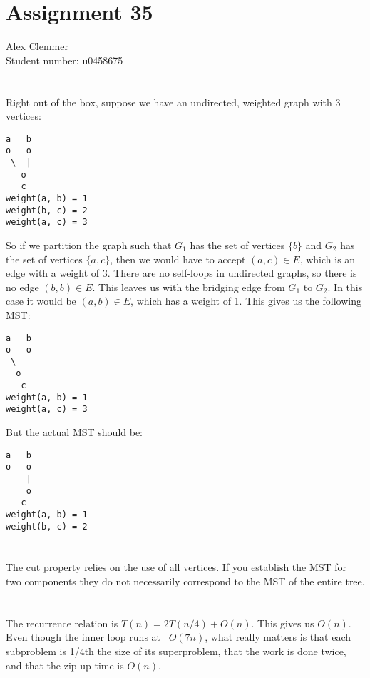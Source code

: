 \documentclass[a4paper]{article}
\begin{document}
\section*{Assignment 35}
Alex Clemmer\\
Student number: u0458675

\section{}

Right out of the box, suppose we have an undirected, weighted graph with 3 vertices:

\begin{verbatim}
a   b
o---o
 \  |
   o
   c
weight(a, b) = 1
weight(b, c) = 2
weight(a, c) = 3
\end{verbatim}

So if we partition the graph such that $G_1$ has the set of vertices $\{b\}$ and $G_2$ has the set of vertices $\{a, c\}$, then we would have to accept $(a, c) \in E$, which is an edge with a weight of 3. There are no self-loops in undirected graphs, so there is no edge $(b, b) \in E$. This leaves us with the bridging edge from $G_1$ to $G_2$. In this case it would be $(a,b) \in E$, which has a weight of 1. This gives us the following MST:

\begin{verbatim}
a   b
o---o
 \  
  o
   c
weight(a, b) = 1
weight(a, c) = 3
\end{verbatim}

But the actual MST should be:

\begin{verbatim}
a   b
o---o
    |
    o
   c
weight(a, b) = 1
weight(b, c) = 2
\end{verbatim}

\section{}

The cut property relies on the use of all vertices. If you establish the MST for two components they do not necessarily correspond to the MST of the entire tree.

\section{}

The recurrence relation is $T(n) = 2T(n/4) + O(n)$. This gives us $O(n)$. Even though the inner loop runs at ~$O(7n)$, what really matters is that each subproblem is 1/4th the size of its superproblem, that the work is done twice, and that the zip-up time is $O(n)$.
\end{document}
